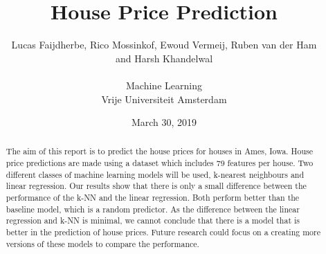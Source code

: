 \documentclass[a4paper,11pt]{article}
\title{House Price Prediction}
\date{March 30, 2019}
\author{Lucas Faijdherbe, Rico Mossinkof, Ewoud Vermeij, Ruben van der Ham\\ and Harsh Khandelwal\\\\
\small Machine Learning\\
\small Vrije Universiteit Amsterdam}
\begin{document}
\maketitle



\begin{abstract}
The aim of this report is to predict the house prices for houses in Ames, Iowa. House price predictions are made using a dataset which includes 79 features per house. Two different classes of machine learning models will be used, k-nearest neighbours and linear regression. Our results show that there is only a small difference between the performance of the k-NN and the linear regression. Both perform better than the baseline model, which is a random predictor. As the difference between the linear regression and k-NN is minimal, we cannot conclude that there is a model that is better in the prediction of house prices. Future research could focus on a creating more versions of these models to compare the performance.
\end{abstract}
\end{document}

